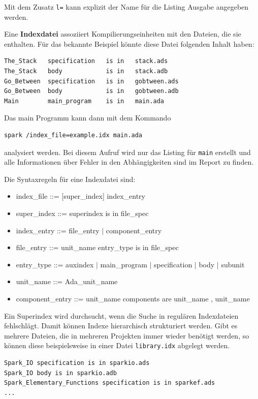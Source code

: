 Mit dem Zusatz \texttt{\/l=} kann explizit der Name für die Listing Ausgabe angegeben werden.

Eine \textbf{Indexdatei} assoziiert Kompilierungseinheiten mit den Dateien, die sie enthalten. Für das bekannte Beispiel könnte diese Datei folgenden Inhalt haben:

\begin{verbatim}
The_Stack	specification	is in	stack.ads
The_Stack	body			is in	stack.adb
Go_Between	specification	is in	gobtween.ads
Go_Between	body			is in	gobtween.adb
Main		main_program	is in	main.ada
\end{verbatim}

Das main Programm kann dann mit dem Kommando
\begin{verbatim}
spark /index_file=example.idx main.ada
\end{verbatim}
analysiert werden. Bei diesem Aufruf wird nur das Listing für \texttt{main} erstellt und alle Informationen über Fehler in den Abhängigkeiten sind im Report zu finden.

Die Syntaxregeln für eine Indexdatei sind:
\begin{itemize}[label={}]
\item index\_file ::= [super\_index] {index\_entry}
\item super\_index ::= superindex is in file\_spec
\item index\_entry ::= file\_entry $|$ component\_entry
\item file\_entry ::= unit\_name entry\_type is in file\_spec
\item entry\_type ::= auxindex $|$ main\_program $|$ specification $|$ body $|$ subunit
\item unit\_name ::= Ada\_unit\_name
\item component\_entry ::= unit\_name components are unit\_name {, unit\_name}
\end{itemize}

Ein Superindex wird durchsucht, wenn die Suche in regulären Indexdateien fehlschlägt. Damit können Indexe hierarchisch strukturiert werden. Gibt es mehrere Dateien, die in mehreren Projekten immer wieder benötigt werden, so können diese beispielsweise in einer Datei \texttt{library.idx} abgelegt werden.

\begin{verbatim}
Spark_IO specification is in sparkio.ads
Spark_IO body is in sparkio.adb
Spark_Elementary_Functions specification is in sparkef.ads
...
\end{verbatim}

